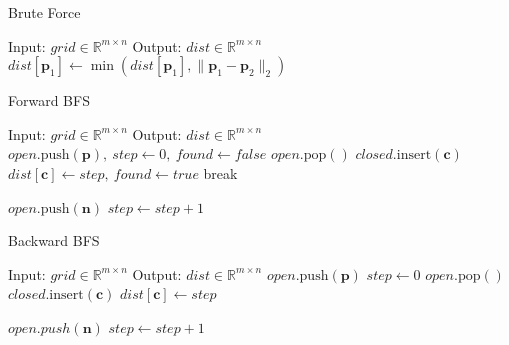 \documentclass{article}
\begin{document}
\begin{algorithm}
    \caption{Brute Force}
    \begin{algorithmic}[1]
        \STATE Input: $grid \in \mathbb{R}^{m \times n}$
        \STATE Output: $dist \in \mathbb{R}^{m \times n}$
                \STATE $dist[\bm{p}_1]\gets \min(dist[\bm{p}_1], \| \bm{p}_1 - \bm{p}_2 \|_2)$
            \ENDFOR
        \ENDFOR
    \end{algorithmic}
\end{algorithm}

\begin{algorithm}
    \caption{Forward BFS}
    \begin{algorithmic}[1]
        \STATE Input: $grid \in \mathbb{R}^{m \times n}$
        \STATE Output: $dist \in \mathbb{R}^{m \times n}$
            \STATE $open.\mathrm{push}(\bm{p}),\ step \gets 0,\ found \gets false$
                    \STATE $open.\mathrm{pop}()$
                    \STATE $closed.\mathrm{insert}(\bm{c})$
                        \STATE $dist[\bm{c}] \gets step,\ found \gets true$
                        \STATE break
                    \ENDIF

                            \STATE $open.\mathrm{push}(\bm{n})$
                        \ENDIF
                    \ENDFOR
                \ENDFOR
                \STATE $step \gets step + 1$
            \ENDWHILE
        \ENDFOR
    \end{algorithmic}
\end{algorithm}

\begin{algorithm}
    \caption{Backward BFS}
    \begin{algorithmic}[1]
        \STATE Input: $grid \in \mathbb{R}^{m \times n}$
        \STATE Output: $dist \in \mathbb{R}^{m \times n}$
                \STATE $open.\mathrm{push}(\bm{p})$
            \ENDIF
        \ENDFOR
        \STATE $step \gets 0$
                \STATE $open.\mathrm{pop}()$
                \STATE $closed.\mathrm{insert}(\bm{c})$
                \STATE $dist[\bm{c}] \gets step$

                        \STATE $open.push(\bm{n})$
                    \ENDIF
                \ENDFOR
            \ENDFOR
            \STATE $step \gets step + 1$
        \ENDWHILE
    \end{algorithmic}
\end{algorithm}
\end{document}
